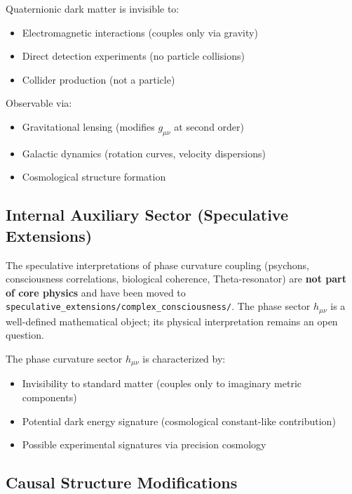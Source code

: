 Quaternionic dark matter is invisible to:
\begin{itemize}
    \item Electromagnetic interactions (couples only via gravity)
    \item Direct detection experiments (no particle collisions)
    \item Collider production (not a particle)
\end{itemize}

Observable via:
\begin{itemize}
    \item Gravitational lensing (modifies $g_{\mu\nu}$ at second order)
    \item Galactic dynamics (rotation curves, velocity dispersions)
    \item Cosmological structure formation
\end{itemize}

\subsection{Internal Auxiliary Sector (Speculative Extensions)}

\begin{tcolorbox}[colback=red!5!white,colframe=red!75!black,title=Speculative Content — Quarantined]
The speculative interpretations of phase curvature coupling (psychons, consciousness correlations,
biological coherence, Theta-resonator) are \textbf{not part of core physics} and have been
moved to \texttt{speculative\_extensions/complex\_consciousness/}.
The phase sector $h_{\mu\nu}$ is a well-defined mathematical object; its physical interpretation
remains an open question.
\end{tcolorbox}

The phase curvature sector $h_{\mu\nu}$ is characterized by:
\begin{itemize}
  \item Invisibility to standard matter (couples only to imaginary metric components)
  \item Potential dark energy signature (cosmological constant-like contribution)
  \item Possible experimental signatures via precision cosmology
\end{itemize}

\subsection{Causal Structure Modifications}

